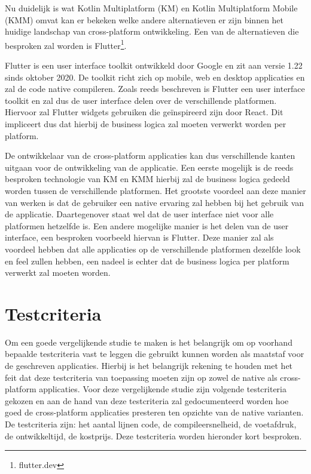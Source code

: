 Nu duidelijk is wat Kotlin Multiplatform (KM) en Kotlin Multiplatform Mobile (KMM) omvat kan er bekeken welke andere alternatieven er zijn binnen het huidige landschap van cross-platform ontwikkeling. Een van de alternatieven die besproken zal worden is Flutter\footnote{flutter.dev}.

Flutter is een user interface toolkit ontwikkeld door Google en zit aan versie 1.22 sinds oktober 2020.\autocite{Sells2020} De toolkit richt zich op mobile, web en desktop applicaties en zal de code native compileren. Zoals reeds beschreven is Flutter een user interface toolkit en zal dus de user interface delen over de verschillende platformen. Hiervoor zal Flutter widgets gebruiken die geïnspireerd zijn door React.\autocite{FlutterWidgets} Dit impliceert dus dat hierbij de business logica zal moeten verwerkt worden per platform.

De ontwikkelaar van de cross-platform applicaties kan dus verschillende kanten uitgaan voor de ontwikkeling van de applicatie. Een eerste mogelijk is de reeds besproken technologie van KM en KMM hierbij zal de business logica gedeeld worden tussen de verschillende platformen. Het grootste voordeel aan deze manier van werken is dat de gebruiker een native ervaring zal hebben bij het gebruik van de applicatie. Daartegenover staat wel dat de user interface niet voor alle platformen hetzelfde is. Een andere mogelijke manier is het delen van de user interface, een besproken voorbeeld hiervan is Flutter. Deze manier zal als voordeel hebben dat alle applicaties op de verschillende platformen dezelfde look en feel zullen hebben, een nadeel is echter dat de business logica per platform verwerkt zal moeten worden.

\section{Testcriteria}
\label{sec:SVZtestcriteria}



Om een goede vergelijkende studie te maken is het belangrijk om op voorhand bepaalde testcriteria vast te leggen die gebruikt kunnen worden als maatstaf voor de geschreven applicaties. Hierbij is het belangrijk rekening te houden met het feit dat deze testcriteria van toepassing moeten zijn op zowel de native als cross-platform applicaties. Voor deze vergelijkende studie zijn volgende testcriteria gekozen en aan de hand van deze testcriteria zal gedocumenteerd worden hoe goed de cross-platform applicaties presteren ten opzichte van de native varianten. De testcriteria zijn: het aantal lijnen code, de compileersnelheid, de voetafdruk, de ontwikkeltijd,  de kostprijs. Deze testcriteria worden hieronder kort besproken. 

